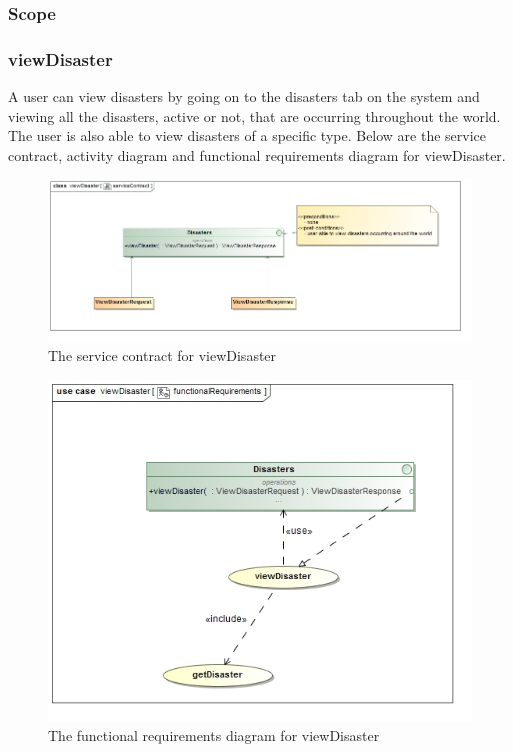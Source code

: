 \subsubsection{Scope}


\subsubsection{viewDisaster}

A user can view disasters by going on to the disasters tab on the system and viewing all the disasters, active or not, that are occurring throughout the world. The user is also able to view disasters of a specific type. Below are the service contract, activity diagram and functional requirements diagram for viewDisaster.

\begin{figure}[H]
	\centering
	\includegraphics[width=1.0\textwidth]{../images/funcReq/viewDisasterServiceContract.jpg}
	\caption{The service contract for viewDisaster \label{overflow}}
\end{figure}

\begin{figure}[H]
	\centering
	\includegraphics[width=1.0\textwidth]{../images/funcReq/viewDisasterFunctionalRequirements.jpg}
	\caption{The functional requirements diagram for viewDisaster \label{overflow}}
\end{figure}

